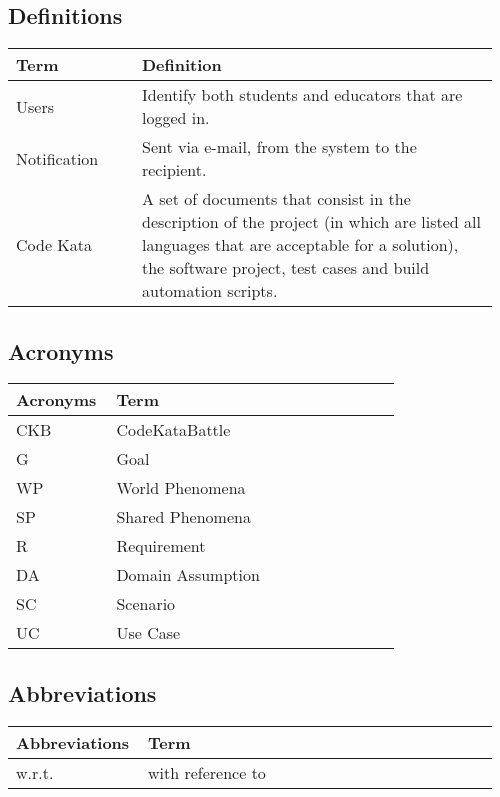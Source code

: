     \subsection{Definitions}
    \begin{center}
	\begin{tabular}{@{}p{0.25\linewidth} p{0.71\linewidth}@{}}
		\toprule
		\textbf{Term} & \textbf{Definition}\\
		\midrule
		Users & Identify both students and educators that are logged in. \\
            Notification & Sent via e-mail, from the system to the recipient. \\
            Code Kata & A set of documents that consist in the description of the project (in which are listed all languages that are acceptable for a solution), the software project, test cases and build automation scripts. \\
		\bottomrule
	\end{tabular}
    \end{center}
    
    \subsection{Acronyms}
    \begin{center}
	\begin{tabular}{@{}p{0.25\linewidth} p{0.71\linewidth}@{}}
		\toprule
		\textbf{Acronyms} & \textbf{Term}\\
		\midrule
		CKB & CodeKataBattle\\
            G & Goal\\
		WP & World Phenomena\\
		SP & Shared Phenomena\\
            R & Requirement\\
            DA & Domain Assumption\\
            SC & Scenario\\
            UC & Use Case\\
		\bottomrule
	\end{tabular}
    \end{center}

    \subsection{Abbreviations}
    \begin{center}
	\begin{tabular}{@{}p{0.25\linewidth} p{0.71\linewidth}@{}}
		\toprule
		\textbf{Abbreviations} & \textbf{Term}\\
		\midrule
		w.r.t. & with reference to\\
		\bottomrule
	\end{tabular}
    \end{center}
    

